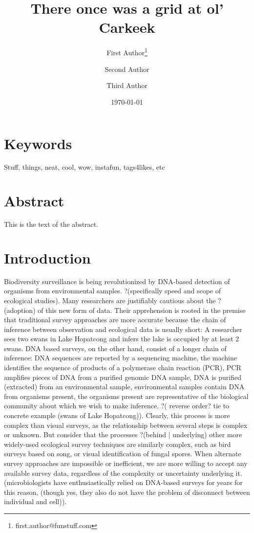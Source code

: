 \documentclass[11pt,letterpaper]{article} %
\date{\today}
\title{There once was a grid at ol' Carkeek}
\author[1]{First Author\thanks{first.author@funstuff.com}}
\author[1,2]{Second Author}
\author[2]{Third Author}
\affil[1]{Department of Computer Science, \LaTeX\ University}
\affil[2]{Department of Mechanical Engineering, Superfabulous University}
\begin{document}
\maketitle
\linenumbers %
\def\linenumberfont{\normalfont\small\rmfamily} %


\section*{Keywords}
Stuff, things, neat, cool, wow, instafun, tags4likes, etc

\section*{Abstract}
This is the text of the abstract.

\section*{Introduction}

Biodiversity surveillance is being revolutionized by DNA-based detection of organisms from environmental samples. ?(specifically speed and scope of ecological studies).
Many researchers are justifiably cautious about the ?(adoption) of this new form of data.
Their apprehension is rooted in the premise that traditional survey approaches are more accurate because the chain of inference between observation and ecological data is usually short: A researcher sees two swans in Lake Hopatcong and infers the lake is occupied by at least 2 swans.
DNA based surveys, on the other hand, consist of a longer chain of inference:
DNA sequences are reported by a sequencing machine, the machine identifies the sequence of products of a polymerase chain reaction (PCR), PCR amplifies pieces of DNA from a purified genomic DNA sample, DNA is purified (extracted) from an environmental sample, environmental samples contain DNA from organisms present, the organisms present are representative of the biological community about which we wish to make inference. ?( reverse order? tie to concrete example (swans of Lake Hopatcong)).
Clearly, this process is more complex than visual surveys, as the relationship between several steps is complex or unknown.
But consider that the processes ?(behind | underlying) other more widely-used ecological survey techniques are similarly complex, such as bird surveys based on song, or visual identification of fungal spores. When alternate survey approaches are impossible or inefficient, we are more willing to accept any available survey data, regardless of the complexity or uncertainty underlying it. (microbiologists have enthusiastically relied on DNA-based surveys for years for this reason, (though yes, they also do not have the problem of disconnect between individual and cell)).
\end{document}
